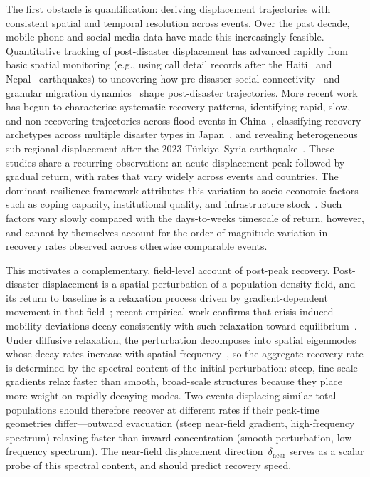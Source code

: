 \documentclass[11pt]{article}
\newcommand{\dnear}{\delta_{\mathrm{near}}}
\begin{document}
The first obstacle is quantification: deriving displacement trajectories with consistent spatial and temporal resolution across events. Over the past decade, mobile phone and social-media data have made this increasingly feasible. Quantitative tracking of post-disaster displacement has advanced rapidly from basic spatial monitoring (e.g., using call detail records after the Haiti~\citep{Lu2012,Bengtsson2011} and Nepal~\citep{Wilson2016} earthquakes) to uncovering how pre-disaster social connectivity~\citep{Yabe2020} and granular migration dynamics~\citep{Acosta2020} shape post-disaster trajectories. More recent work has begun to characterise systematic recovery patterns, identifying rapid, slow, and non-recovering trajectories across flood events in China~\citep{Tang2023}, classifying recovery archetypes across multiple disaster types in Japan~\citep{Yabe2020b}, and revealing heterogeneous sub-regional displacement after the 2023 T\"{u}rkiye--Syria earthquake~\citep{Aydogdu2025}. These studies share a recurring observation: an acute displacement peak followed by gradual return, with rates that vary widely across events and countries. The dominant resilience framework attributes this variation to socio-economic factors such as coping capacity, institutional quality, and infrastructure stock~\citep{Cutter2003,Aldrich2012}. Such factors vary slowly compared with the days-to-weeks timescale of return, however, and cannot by themselves account for the order-of-magnitude variation in recovery rates observed across otherwise comparable events.

This motivates a complementary, field-level account of post-peak recovery. Post-disaster displacement is a spatial perturbation of a population density field, and its return to baseline is a relaxation process driven by gradient-dependent movement in that field~\citep{Mazzoli2019,Lenormand2015}; recent empirical work confirms that crisis-induced mobility deviations decay consistently with such relaxation toward equilibrium~\citep{Li2022}. Under diffusive relaxation, the perturbation decomposes into spatial eigenmodes whose decay rates increase with spatial frequency~\citep{Crank1975}, so the aggregate recovery rate is determined by the spectral content of the initial perturbation: steep, fine-scale gradients relax faster than smooth, broad-scale structures because they place more weight on rapidly decaying modes. Two events displacing similar total populations should therefore recover at different rates if their peak-time geometries differ---outward evacuation (steep near-field gradient, high-frequency spectrum) relaxing faster than inward concentration (smooth perturbation, low-frequency spectrum). The near-field displacement direction~$\dnear$ serves as a scalar probe of this spectral content, and should predict recovery speed.
\end{document}
